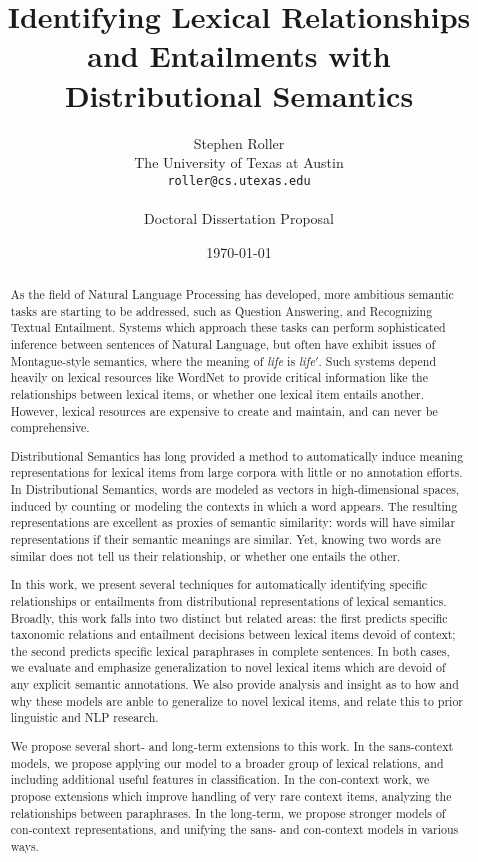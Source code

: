 \documentclass[letterpaper,11pt]{article}
\title{Identifying Lexical Relationships and Entailments with Distributional Semantics}
\author{Stephen Roller\\
The University of Texas at Austin\\
{\tt roller@cs.utexas.edu}\\
\\
Doctoral Dissertation Proposal}
\date{\today}
\begin{document}
\maketitle

\begin{abstract}
  As the field of Natural Language Processing has developed, more ambitious
  semantic tasks are starting to be addressed, such as Question Answering, and
  Recognizing Textual Entailment. Systems which approach these tasks can
  perform sophisticated inference between sentences of Natural Language, but
  often have exhibit issues of Montague-style semantics, where the meaning of
  {\em life} is {\em life$'$}. Such systems depend heavily on lexical resources
  like WordNet to provide critical information like the
  relationships between lexical items, or whether one lexical item entails
  another. However, lexical resources are expensive to create and maintain, and
  can never be comprehensive.

  Distributional Semantics has long provided a method to automatically induce
  meaning representations for lexical items from large corpora with little or
  no annotation efforts. In Distributional Semantics, words are modeled as
  vectors in high-dimensional spaces, induced by counting or modeling the
  contexts in which a word appears. The resulting representations are excellent
  as proxies of semantic similarity: words will have similar representations if
  their semantic meanings are similar. Yet, knowing two words are similar does
  not tell us their relationship, or whether one entails the other.

  In this work, we present several techniques for automatically identifying
  specific relationships or entailments from distributional representations of
  lexical semantics. Broadly, this work falls into two distinct but related
  areas: the first predicts specific taxonomic relations and entailment
  decisions between lexical items devoid of context;
  the second predicts specific lexical paraphrases in complete sentences. In
  both cases, we evaluate and emphasize generalization to novel lexical items
  which are devoid of any explicit semantic annotations.  We also provide
  analysis and insight as to how and why these models are anble to generalize
  to novel lexical items, and relate this to prior linguistic and NLP research.

  We propose several short- and long-term extensions to this work. In the
  sans-context models, we propose applying our model to a broader group of
  lexical relations, and including additional useful features in
  classification.  In the con-context work, we propose extensions which
  improve handling of very rare context items, analyzing the
  relationships between paraphrases. In the long-term, we propose stronger
  models of con-context representations, and unifying the sans- and con-context models in various ways.

\end{abstract}
\end{document}

